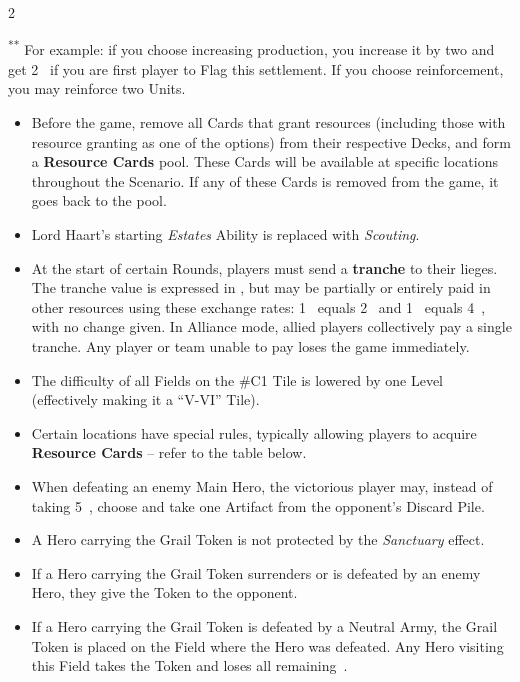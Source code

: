 \begin{multicols*}{2}
\begin{table}[b!]
  \label{fn:bonus}
  \footnotesize{\textsuperscript{**} For example: if you choose increasing  production, you increase it by two and get 2~ if you are first player to Flag this settlement. If you choose reinforcement, you may reinforce two Units.}
\end{table}

\begin{itemize}
  \item Before the game, remove all Cards that grant resources (including those with resource granting as one of the options) from their respective Decks, and form a \textbf{Resource Cards} pool. These Cards will be available at specific locations throughout the Scenario. If any of these Cards is removed from the game, it goes back to the pool.
  \item Lord Haart's starting \textit{Estates} Ability is replaced with \textit{Scouting}.
  \item At the start of certain Rounds, players must send a \textbf{tranche} to their lieges. The tranche value is expressed in , but may be partially or entirely paid in other resources using these exchange rates: 1~ equals 2~ and 1~ equals 4~, with no change given. In Alliance mode, allied players collectively pay a single tranche. Any player or team unable to pay loses the game immediately.
  \item The difficulty of all Fields on the \#C1 Tile is lowered by one Level (effectively making it a ``V-VI'' Tile).
  \item Certain locations have special rules, typically allowing players to acquire \textbf{Resource Cards} -- refer to the table below.
  \item When defeating an enemy Main Hero, the victorious player may, instead of taking \mbox{5~}, choose and take one Artifact from the opponent's Discard Pile.
  \item A Hero carrying the Grail Token is not protected by the \textit{Sanctuary} effect.
  \item If a Hero carrying the Grail Token surrenders or is defeated by an enemy Hero, they give the Token to the opponent.
  \item If a Hero carrying the Grail Token is defeated by a Neutral Army, the Grail Token is placed on the Field where the Hero was defeated. Any Hero visiting this Field takes the Token and loses all remaining~.
\end{itemize}


\end{multicols*}

